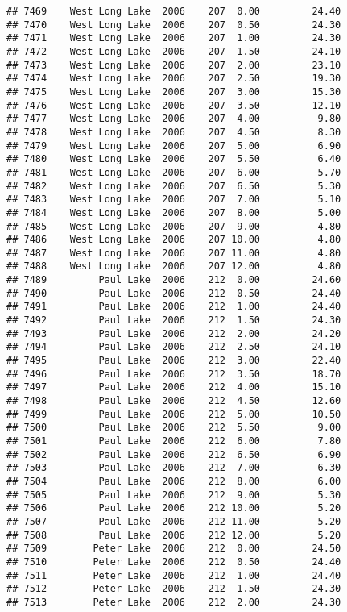 \documentclass[
]{article}
\begin{document}
\begin{verbatim}
## 7469    West Long Lake  2006    207  0.00         24.40
## 7470    West Long Lake  2006    207  0.50         24.30
## 7471    West Long Lake  2006    207  1.00         24.30
## 7472    West Long Lake  2006    207  1.50         24.10
## 7473    West Long Lake  2006    207  2.00         23.10
## 7474    West Long Lake  2006    207  2.50         19.30
## 7475    West Long Lake  2006    207  3.00         15.30
## 7476    West Long Lake  2006    207  3.50         12.10
## 7477    West Long Lake  2006    207  4.00          9.80
## 7478    West Long Lake  2006    207  4.50          8.30
## 7479    West Long Lake  2006    207  5.00          6.90
## 7480    West Long Lake  2006    207  5.50          6.40
## 7481    West Long Lake  2006    207  6.00          5.70
## 7482    West Long Lake  2006    207  6.50          5.30
## 7483    West Long Lake  2006    207  7.00          5.10
## 7484    West Long Lake  2006    207  8.00          5.00
## 7485    West Long Lake  2006    207  9.00          4.80
## 7486    West Long Lake  2006    207 10.00          4.80
## 7487    West Long Lake  2006    207 11.00          4.80
## 7488    West Long Lake  2006    207 12.00          4.80
## 7489         Paul Lake  2006    212  0.00         24.60
## 7490         Paul Lake  2006    212  0.50         24.40
## 7491         Paul Lake  2006    212  1.00         24.40
## 7492         Paul Lake  2006    212  1.50         24.30
## 7493         Paul Lake  2006    212  2.00         24.20
## 7494         Paul Lake  2006    212  2.50         24.10
## 7495         Paul Lake  2006    212  3.00         22.40
## 7496         Paul Lake  2006    212  3.50         18.70
## 7497         Paul Lake  2006    212  4.00         15.10
## 7498         Paul Lake  2006    212  4.50         12.60
## 7499         Paul Lake  2006    212  5.00         10.50
## 7500         Paul Lake  2006    212  5.50          9.00
## 7501         Paul Lake  2006    212  6.00          7.80
## 7502         Paul Lake  2006    212  6.50          6.90
## 7503         Paul Lake  2006    212  7.00          6.30
## 7504         Paul Lake  2006    212  8.00          6.00
## 7505         Paul Lake  2006    212  9.00          5.30
## 7506         Paul Lake  2006    212 10.00          5.20
## 7507         Paul Lake  2006    212 11.00          5.20
## 7508         Paul Lake  2006    212 12.00          5.20
## 7509        Peter Lake  2006    212  0.00         24.50
## 7510        Peter Lake  2006    212  0.50         24.40
## 7511        Peter Lake  2006    212  1.00         24.40
## 7512        Peter Lake  2006    212  1.50         24.30
## 7513        Peter Lake  2006    212  2.00         24.30

\end{verbatim}
\end{document}
